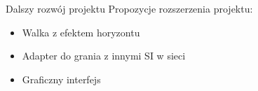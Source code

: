 \begin{frame}{Dalszy rozwój projektu}
    Propozycje rozszerzenia projektu:
    \begin{itemize}
        \item Walka z efektem horyzontu
        \item Adapter do grania z innymi SI w sieci
        \item Graficzny interfejs
    \end{itemize}





\end{frame}
